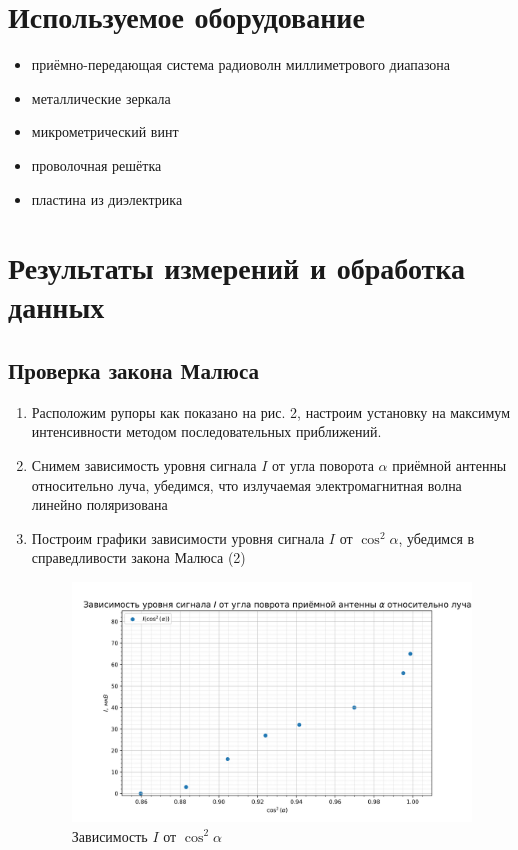 \documentclass[a4paper, 12pt]{article}
\begin{document}
\newpage

\section{Используемое оборудование}

\begin{itemize}
    \item приёмно-передающая система радиоволн миллиметрового диапазона
    \item металлические зеркала
    \item микрометрический винт
    \item проволочная решётка
    \item пластина из диэлектрика
\end{itemize}

\newpage

\section{Результаты измерений и обработка данных}

\subsection{Проверка закона Малюса}

\begin{enumerate}
    \item Расположим рупоры как показано на рис. 2, настроим установку на максимум интенсивности методом последовательных приближений.
    \item Снимем зависимость уровня сигнала $I$ от угла поворота $\alpha$ приёмной антенны относительно луча, убедимся, что излучаемая электромагнитная волна линейно поляризована
    \item Построим графики зависимости уровня сигнала $I$ от $\cos^2 \alpha$, убедимся в справедливости закона Малюса (2)

\begin{figure}[h!]
\begin{center}
    \includegraphics[scale=0.7]{4.6.1_1.png}
\end{center}
\caption{Зависимость $I$ от $\cos^2 \alpha$}
\label{ris:experimcoded}
\end{figure}
\end{enumerate}
\end{document}
